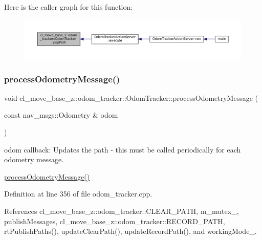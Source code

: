 Here is the caller graph for this function\+:
\nopagebreak
\begin{figure}[H]
\begin{center}
\leavevmode
\includegraphics[width=350pt]{classcl__move__base__z_1_1odom__tracker_1_1OdomTracker_a2749e5cd0443423d50864a0166b078b9_icgraph}
\end{center}
\end{figure}
\mbox{\label{classcl__move__base__z_1_1odom__tracker_1_1OdomTracker_a12c5a839cfde2e8f2f55a5e0c9647b18}} 
\subsubsection{\texorpdfstring{process\+Odometry\+Message()}{processOdometryMessage()}}
{\footnotesize\ttfamily void cl\+\_\+move\+\_\+base\+\_\+z\+::odom\+\_\+tracker\+::\+Odom\+Tracker\+::process\+Odometry\+Message (\begin{DoxyParamCaption}\item[{const nav\+\_\+msgs\+::\+Odometry \&}]{odom }\end{DoxyParamCaption})\hspace{0.3cm}{\ttfamily [virtual]}}



odom callback\+: Updates the path -\/ this must be called periodically for each odometry message. 

\hyperlink{classcl__move__base__z_1_1odom__tracker_1_1OdomTracker_a12c5a839cfde2e8f2f55a5e0c9647b18}{process\+Odometry\+Message()} 

Definition at line 356 of file odom\+\_\+tracker.\+cpp.



References cl\+\_\+move\+\_\+base\+\_\+z\+::odom\+\_\+tracker\+::\+C\+L\+E\+A\+R\+\_\+\+P\+A\+TH, m\+\_\+mutex\+\_\+, publish\+Messages, cl\+\_\+move\+\_\+base\+\_\+z\+::odom\+\_\+tracker\+::\+R\+E\+C\+O\+R\+D\+\_\+\+P\+A\+TH, rt\+Publish\+Paths(), update\+Clear\+Path(), update\+Record\+Path(), and working\+Mode\+\_\+.



